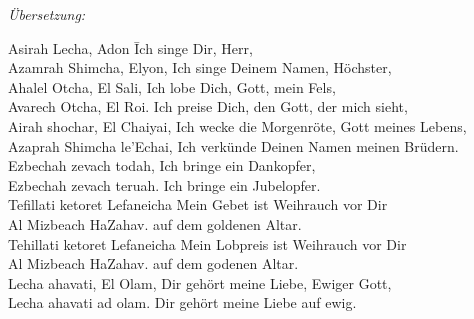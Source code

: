 
\textit{Übersetzung:}\\
\begin{tabbing}
Asirah Lecha, Adon \hspace{40px} \= Ich singe Dir, Herr,\\
Azamrah Shimcha, Elyon, \> Ich singe Deinem Namen, Höchster,\\
Ahalel Otcha, El Sali, \> Ich lobe Dich, Gott, mein Fels,\\
Avarech Otcha, El Roi. \> Ich preise Dich, den Gott, der mich sieht,\\
Airah shochar, El Chaiyai, \> Ich wecke die Morgenröte, Gott meines Lebens,\\
Azaprah Shimcha le'Echai, \> Ich verkünde Deinen Namen meinen Brüdern.\\
Ezbechah zevach todah, \> Ich bringe ein Dankopfer,\\
Ezbechah zevach teruah. \> Ich bringe ein Jubelopfer.\\
Tefillati ketoret Lefaneicha \> Mein Gebet ist Weihrauch vor Dir\\
Al Mizbeach HaZahav. \> auf dem goldenen Altar.\\
Tehillati ketoret Lefaneicha \> Mein Lobpreis ist Weihrauch vor Dir\\
Al Mizbeach HaZahav. \> auf dem godenen Altar.\\
Lecha ahavati, El Olam, \> Dir gehört meine Liebe, Ewiger Gott,\\
Lecha ahavati ad olam. \> Dir gehört meine Liebe auf ewig.\\
\end{tabbing}